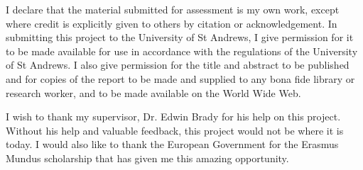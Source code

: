 I declare that the material submitted for assessment is my own work, except where credit is explicitly given to others by citation or acknowledgement.
\clearpage
In submitting this project to the University of St Andrews, I give permission for it to be made available for use in accordance with the regulations of the University of St Andrews. I also give permission for the title and abstract to be published and for copies of the report to be made and supplied to any bona fide library or research worker, and to be made available on the World Wide Web.

\clearpage
I wish to thank my supervisor, Dr. Edwin Brady for his help on this project. Without his help and valuable feedback, this project would not be where it is today. I would also like to thank the European Government for the Erasmus Mundus scholarship that has given me this amazing opportunity.

